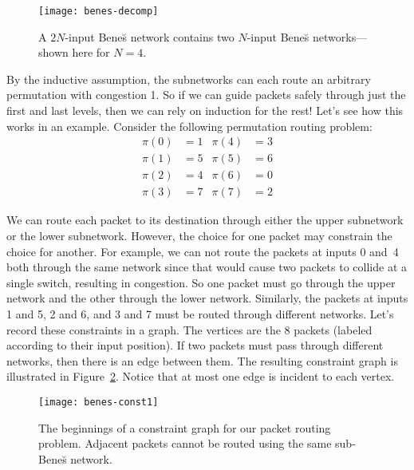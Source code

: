 \begin{figure}

\texttt{[image: benes-decomp]}

\caption{A $2N$-input Bene\u{s} network contains two $N$-input
  Bene\u{s} networks---shown here for $N = 4$.}

\label{fig:6EU}

\end{figure}

By the inductive assumption, the subnetworks can each route an
arbitrary permutation with congestion 1.  So if we can guide packets
safely through just the first and last levels, then we can rely on
induction for the rest!  Let's see how this works in an example.
Consider the following permutation routing problem:
%
\begin{align*}
\pi(0) & = 1 & \pi(4) & = 3 \\
\pi(1) & = 5 & \pi(5) & = 6 \\
\pi(2) & = 4 & \pi(6) & = 0 \\
\pi(3) & = 7 & \pi(7) & = 2
\end{align*}

We can route each packet to its destination through either the upper
subnetwork or the lower subnetwork.  However, the choice for one
packet may constrain the choice for another.  For example, we can not
route the packets at inputs 0 and~4 both through the same network
since that would cause two packets to collide at a single switch,
resulting in congestion.  So one packet must go through the upper
network and the other through the lower network.  Similarly, the
packets at inputs 1 and 5, 2 and 6, and 3 and 7 must be routed through
different networks.  Let's record these constraints in a graph.  The
vertices are the 8 packets (labeled according to their input
position).  If two packets must pass through different networks, then
there is an edge between them.  The resulting constraint graph is
illustrated in Figure~\ref{fig:6EV}.  Notice that at most one edge is
incident to each vertex.

\begin{figure}

\texttt{[image: benes-const1]}

\caption{The beginnings of a constraint graph for our packet routing
  problem.  Adjacent packets cannot be routed using the same
  sub-Bene\u{s} network.}

\label{fig:6EV}

\end{figure}

